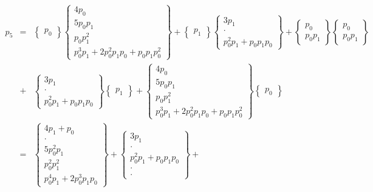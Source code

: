 \documentclass[a4paper,12pt]{article}
\numberwithin{definition}{section}
\numberwithin{lemma}{section}
\numberwithin{proposition}{section}
\numberwithin{theorem}{section}
\numberwithin{grammar}{section}
\numberwithin{program}{section}
\numberwithin{convention}{section}
\numberwithin{corollary}{section}
\numberwithin{principle}{section}
\begin{document}
$$\begin{array}{lcl}
p_5 & = & \begin{Bmatrix} p_0 \end{Bmatrix} \begin{Bmatrix} 4 p_0 \\ 5 p_0 p_1 \\ p_0 p_1^2 \\ p_0^3 p_1 + 2 p_0^2 p_1 p_0 + p_0 p_1 p_0^2 \end{Bmatrix} +
          \begin{Bmatrix} p_1 \end{Bmatrix} \begin{Bmatrix}  3 p_1 \\ \cdot \\ p_0^2 p_1 + p_0 p_1 p_0 \end{Bmatrix} +
          \begin{Bmatrix} p_0 \\  p_0 p_1 \end{Bmatrix} \begin{Bmatrix} p_0 \\  p_0 p_1 \end{Bmatrix} \\
    & + & \begin{Bmatrix} 3 p_1 \\ \cdot \\ p_0^2 p_1 + p_0 p_1 p_0 \end{Bmatrix} \begin{Bmatrix} p_1 \end{Bmatrix} +
          \begin{Bmatrix} 4 p_0 \\ 5 p_0 p_1 \\ p_0 p_1^2 \\ p_0^3 p_1 + 2 p_0^2 p_1 p_0 + p_0 p_1 p_0^2 \end{Bmatrix}\begin{Bmatrix} p_0 \end{Bmatrix}\\
    & = & \begin{Bmatrix} 4 p_1 + p_0\\ \cdot \\ 5 p_0^2 p_1 \\ p_0^2 p_1^2 \\ p_0^4 p_1 + 2 p_0^3 p_1 p_0 \end{Bmatrix} +
          \begin{Bmatrix} 3 p_1 \\ \cdot \\ p_0^2 p_1 + p_0 p_1 p_0 \\ \cdot \\ \cdot \end{Bmatrix} +

\end{array}$$
\end{document}
